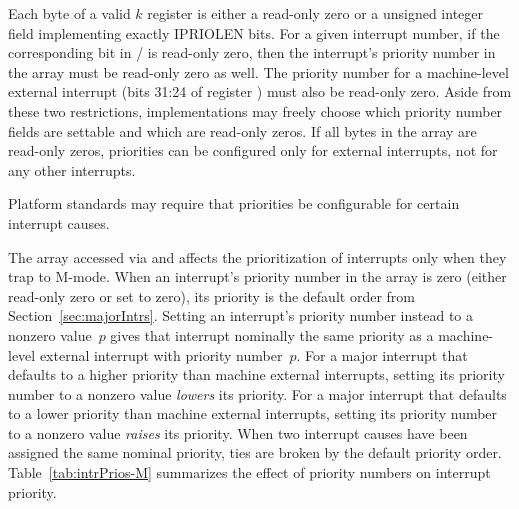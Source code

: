 Each byte of a valid $k$ register is either a read-only zero
or a {\WARL} unsigned integer field implementing exactly IPRIOLEN bits.
For a given interrupt number, if the corresponding bit in
/ is read-only zero, then the interrupt's priority
number in the  array must be read-only zero as well.
The priority number for a machine-level external interrupt (bits 31:24
of register ) must also be read-only zero.
Aside from these two restrictions, implementations may freely choose
which priority number fields are settable and which are read-only
zeros.
If all bytes in the  array are read-only zeros, priorities
can be configured only for external interrupts, not for any other
interrupts.

\begin{commentary}
Platform standards may require that priorities be configurable for
certain interrupt causes.
\end{commentary}

The  array accessed via  and  affects the
prioritization of interrupts only when they trap to \mbox{M-mode}.
When an interrupt's priority number in the array is zero (either
read-only zero or set to zero), its priority is the default order from
Section~\ref{sec:majorIntrs}.
Setting an interrupt's priority number instead to a nonzero value~$p$
gives that interrupt nominally the same priority as a machine-level
external interrupt with priority number~$p$.
For a major interrupt that defaults to a higher priority than machine
external interrupts, setting its priority number to a nonzero value
\emph{lowers} its priority.
For a major interrupt that defaults to a lower priority than machine
external interrupts, setting its priority number to a nonzero value
\emph{raises} its priority.
When two interrupt causes have been assigned the same nominal priority,
ties are broken by the default priority order.
Table~\ref{tab:intrPrios-M} summarizes the effect of priority numbers
on interrupt priority.

